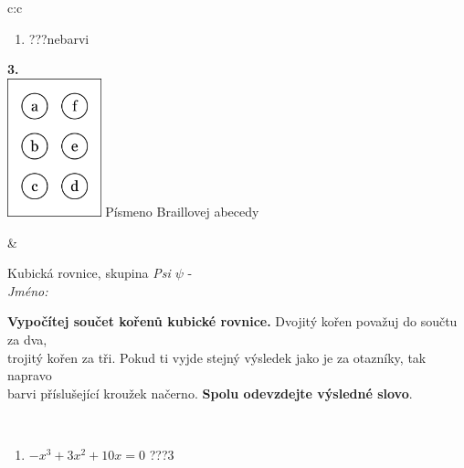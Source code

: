 \documentclass[10pt]{report}
\begin{document}
\begin{tabular}{c:c}
\begin{minipage}[c][104.5mm][t]{0.5\linewidth}
\begin{center}
\begin{minipage}{0.79\linewidth}
\begin{center}
\begin{varwidth}{\linewidth}
\begin{enumerate}
\item \quad \dotfill\; ???\;\dotfill \quad nebarvi
\end{enumerate}
\end{varwidth}
\end{center}
\end{minipage}
\begin{minipage}{0.20\linewidth}
\begin{center}
{\Huge\bfseries 3.} \\[2mm]
\includegraphics[height=40mm]{../images/braille.png}
{\small Písmeno Braillovej abecedy}
\end{center}
\end{minipage}
\end{center}
\end{minipage}
&
\begin{minipage}[c][104.5mm][t]{0.5\linewidth}
\begin{center}
\vspace{7mm}
{\huge Kubická rovnice, skupina \textit{Psi $\psi$} -}\\[5mm]
\textit{Jméno:}\phantom{xxxxxxxxxxxxxxxxxxxxxxxxxxxxxxxxxxxxxxxxxxxxxxxxxxxxxxxxxxxxxxxxx}\\[5mm]
\begin{minipage}{0.95\linewidth}
\begin{center}
\textbf{Vypočítej součet kořenů kubické rovnice.} Dvojitý kořen považuj do součtu za dva,\\trojitý kořen za tři. Pokud ti vyjde stejný výsledek jako je za otazníky, tak napravo\\barvi příslušející kroužek načerno. \textbf{Spolu odevzdejte výsledné slovo}.
\end{center}
\end{minipage}
\\[1mm]
\begin{minipage}{0.79\linewidth}
\begin{center}
\begin{varwidth}{\linewidth}
\begin{enumerate}
\Large
\item $-x^3+3x^2+10x=0$\quad \dotfill\; ???\;\dotfill \quad $3$

\end{enumerate}
\end{varwidth}
\end{center}
\end{minipage}
\end{center}
\end{minipage}
\end{tabular}
\end{document}
